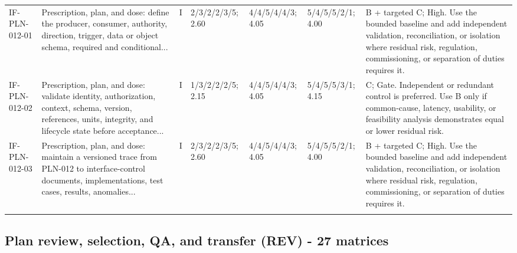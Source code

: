 \documentclass[11pt,letterpaper]{article}
\begin{document}
\begin{scriptsize}
\begin{longtable}{@{}L{0.11\textwidth}L{0.165\textwidth}L{0.04\textwidth}L{0.115\textwidth}L{0.115\textwidth}L{0.115\textwidth}L{0.235\textwidth}@{}}
\addlinespace[2pt]
IF-PLN-012-01 & Prescription, plan, and dose: define the producer, consumer, authority, direction, trigger, data or object schema, required and conditional... & I & 2/3/2/2/3/5; 2.60 & 4/4/5/4/4/3; 4.05 & 5/4/5/5/2/1; 4.00 & B + targeted C; High. Use the bounded baseline and add independent validation, reconciliation, or isolation where residual risk, regulation, commissioning, or separation of duties requires it. \\
\addlinespace[2pt]
IF-PLN-012-02 & Prescription, plan, and dose: validate identity, authorization, context, schema, version, references, units, integrity, and lifecycle state before acceptance... & I & 1/3/2/2/2/5; 2.15 & 4/4/5/4/4/3; 4.05 & 5/4/5/5/3/1; 4.15 & C; Gate. Independent or redundant control is preferred. Use B only if common-cause, latency, usability, or feasibility analysis demonstrates equal or lower residual risk. \\
\addlinespace[2pt]
IF-PLN-012-03 & Prescription, plan, and dose: maintain a versioned trace from PLN-012 to interface-control documents, implementations, test cases, results, anomalies... & I & 2/3/2/2/3/5; 2.60 & 4/4/5/4/4/3; 4.05 & 5/4/5/5/2/1; 4.00 & B + targeted C; High. Use the bounded baseline and add independent validation, reconciliation, or isolation where residual risk, regulation, commissioning, or separation of duties requires it. \\
\addlinespace[2pt]
\end{longtable}
\end{scriptsize}

\subsection{Plan review, selection, QA, and transfer (REV) - 27 matrices}
\end{document}
